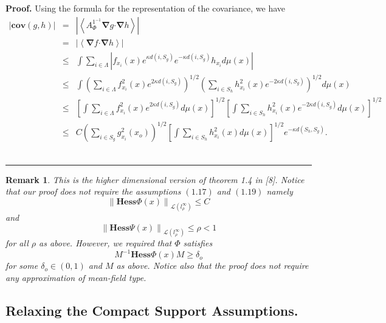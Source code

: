 \documentclass{article}
\newtheorem{remark}[theorem]{Remark}
\newenvironment{proof}[1][Proof]{\noindent\textbf{#1.} }{\ \rule{0.5em}{0.5em}}
\begin{document}
\begin{proof}
Using the formula for the representation of the covariance, we have%
\begin{eqnarray*}
\left| \mathbf{cov}(g,h)\right| &=&\left| \left\langle A_{\Phi }^{1^{-1}}%
\mathbf{\nabla }g\mathbf{\cdot \nabla }h\right\rangle \right| \\
&=&\left| \left\langle \mathbf{\nabla }f\mathbf{\cdot \nabla }h\right\rangle
\right| \\
&\leq &\int \sum\limits_{i\in \Lambda }\left| f_{x_{i}}(x)e^{\kappa
d(i,S_{g})}e^{-\kappa d(i,S_{g})}h_{x_{i}}d\mu (x)\right| \\
&\leq &\int \left( \sum\limits_{i\in \Lambda }f_{x_{i}}^{2}(x)e^{2\kappa
d(i,S_{g})}\right) ^{1/2}\left( \sum\limits_{i\in
S_{h}}h_{x_{i}}^{2}(x)e^{-2\kappa d(i,S_{g})}\right) ^{1/2}d\mu (x) \\
&\leq &\left[ \int \sum\limits_{i\in \Lambda }f_{x_{i}}^{2}(x)e^{2\kappa
d(i,S_{g})}d\mu (x)\right] ^{1/2}\left[ \int \sum\limits_{i\in
S_{h}}h_{x_{i}}^{2}(x)e^{-2\kappa d(i,S_{g})}d\mu (x)\right] ^{1/2} \\
&\leq &C\left( \sum_{i\in S_{g}}g_{x_{i}}^{2}(x_{o})\right) ^{1/2}\left[
\int \sum\limits_{i\in S_{h}}h_{x_{i}}^{2}(x)d\mu (x)\right]
^{1/2}e^{-\kappa d(S_{h},S_{g})}.
\end{eqnarray*}
\end{proof}

\begin{remark}
This is the higher dimensional version of theorem 1.4 in [8]. Notice that
our proof does not require the assumptions $\left( 1.17\right) $ and $\left(
1.19\right) $ namely 
\begin{equation*}
\left\| \mathbf{Hess}\Phi (x)\right\| _{\mathcal{L}(l_{\rho }^{\infty
})}\leq C
\end{equation*}%
and 
\begin{equation*}
\left\| \mathbf{Hess}\Psi (x)\right\| _{\mathcal{L}(l_{\rho }^{\infty
})}\leq \rho <1
\end{equation*}%
for all $\rho $ as above. However, we required that $\Phi $ satisfies 
\begin{equation*}
M^{-1}\mathbf{Hess}\Phi (x)M\geq \delta _{o}
\end{equation*}%
for some $\delta _{o}\in (0,1)$ and $M$ as above.\newline
Notice also that the proof does not require any approximation of mean-field
type.
\end{remark}

\subsection{Relaxing the Compact Support Assumptions.}
\end{document}

